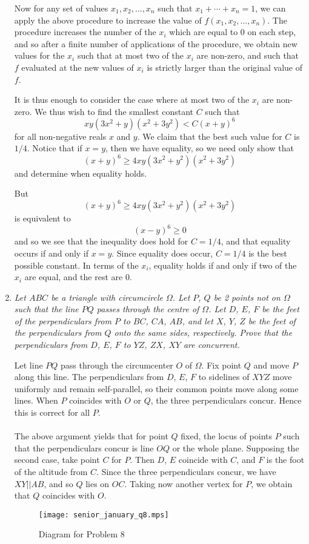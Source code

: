 \documentclass{article}
\begin{document}
\begin{enumerate}[1.]
Now for any set of values $x_1, x_2, \dots, x_n$ such that $x_1 + \cdots + x_n = 1$, we can apply the above procedure to increase the value of $f(x_1, x_2, \dots, x_n)$. The procedure increases the number of the $x_i$ which are equal to $0$ on each step, and so after a finite number of applications of the procedure, we obtain new values for the $x_i$ such that at most two of the $x_i$ are non-zero, and such that $f$ evaluated at the new values of $x_i$ is strictly larger than the original value of $f$.

It is thus enough to consider the case where at most two of the $x_i$ are non-zero. We thus wish to find the smallest constant $C$ such that
\[
	x y (3x^2 + y)(x^2 + 3y^2) < C{(x + y)}^6
\]
for all non-negative reals $x$ and $y$. We claim that the best such value for $C$ is $1/4$. Notice that if $x = y$, then we have equality, so we need only show that
\[
	{(x + y)}^6 \geq 4xy(3x^2 + y^2)(x^2 + 3y^2)
\]
and determine when equality holds.

But
\[
	{(x + y)}^6 \geq 4xy(3x^2 + y^2)(x^2 + 3y^2)
\]
is equivalent to
\[
	{(x - y)}^6 \geq 0
\]
and so we see that the inequality does hold for $C = 1/4$, and that equality occurs if and only if $x = y$. Since equality does occur, $C = 1/4$ is the best possible constant. In terms of the $x_i$, equality holds if and only if two of the $x_i$ are equal, and the rest are $0$.


\vspace{6pt}
\item 
\textit{Let $ABC$ be a triangle with circumcircle $\Omega$. Let $P$, $Q$ be 2 points not on $\Omega$ such that the line $PQ$ passes through the centre of $\Omega$. Let $D$, $E$, $F$ be the feet of the perpendiculars from $P$ to $BC$, $CA$, $AB$, and let $X$, $Y$, $Z$ be the feet of the perpendiculars from $Q$ onto the same sides, respectively. Prove that the perpendiculars from $D$, $E$, $F$ to $YZ$, $ZX$, $XY$ are concurrent.}

Let line $PQ$ pass through the circumcenter $O$ of $\Omega$. Fix point $Q$ and move $P$ along this line. The perpendiculars from $D$, $E$, $F$ to sidelines of $XYZ$ move uniformly and remain self-parallel, so their common points move along some lines. When $P$ coincides
with $O$ or $Q$, the three perpendiculars concur. Hence this is correct for all $P$.\\\\
The above argument yields that for point $Q$ fixed, the locus of points $P$ such that the perpendiculars concur is line $OQ$ or the whole plane. Supposing the second case, take point $C$ for $P$. Then $D$, $E$ coincide with $C$, and $F$ is the foot of the altitude from $C$. Since the three perpendiculars concur, we have $XY||AB$, and so $Q$ lies on $OC$. Taking now another vertex for $P$, we obtain that $Q$ coincides with $O$.

\begin{figure}[!hb]
\centering
\texttt{[image: senior\_january\_q8.mps]}
\caption{Diagram for Problem 8}
\end{figure}


\end{enumerate}
\end{document}
